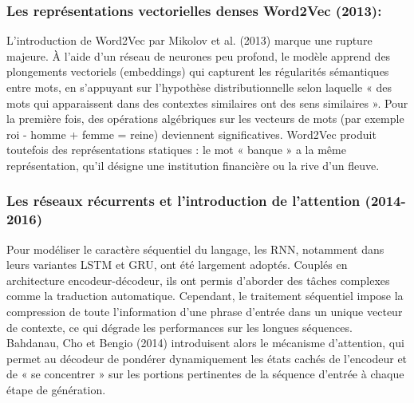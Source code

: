 \documentclass[12pt,twoside]{report}
\begin{document}
\subsubsection{Les représentations vectorielles denses Word2Vec (2013):}
L'introduction de Word2Vec par Mikolov et al. (2013) marque une rupture majeure. À l'aide d'un réseau de neurones peu profond, le modèle apprend des plongements vectoriels (embeddings) qui capturent les régularités sémantiques entre mots, en s'appuyant sur l'hypothèse distributionnelle selon laquelle « des mots qui apparaissent dans des contextes similaires ont des sens similaires ». Pour la première fois, des opérations algébriques sur les vecteurs de mots (par exemple roi - homme + femme = reine) deviennent significatives. Word2Vec produit toutefois des représentations statiques : le mot « banque » a la même représentation, qu'il désigne une institution financière ou la rive d'un fleuve.

\subsubsection{Les réseaux récurrents et l'introduction de l'attention (2014-2016)}
Pour modéliser le caractère séquentiel du langage, les RNN, notamment dans leurs variantes LSTM et GRU, ont été largement adoptés. Couplés en architecture encodeur-décodeur, ils ont permis d'aborder des tâches complexes comme la traduction automatique. Cependant, le traitement séquentiel impose la compression de toute l'information d'une phrase d'entrée dans un unique vecteur de contexte, ce qui dégrade les performances sur les longues séquences. Bahdanau, Cho et Bengio (2014) introduisent alors le mécanisme d'attention, qui permet au décodeur de pondérer dynamiquement les états cachés de l'encodeur et de « se concentrer » sur les portions pertinentes de la séquence d'entrée à chaque étape de génération.
\end{document}
